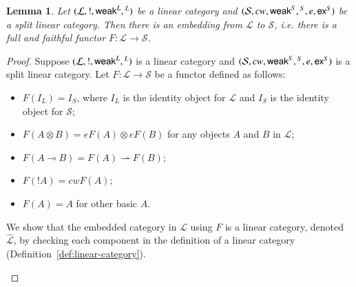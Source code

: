 \documentclass{article}
\newtheorem{lemma}[theorem]{Lemma}
\let\mto\to
\let\to\relax
\newcommand{\to}{\rightarrow}
\let\c\relax
\newcommand{\cat}[1]{\mathcal{#1}}
\newcommand{\limp}[0]{\multimap}
\newcommand{\w}[1]{\mathsf{weak}_{#1}}
\newcommand{\c}[1]{\mathsf{contra}_{#1}}
\newcommand{\e}[1]{\mathsf{ex}_{#1}}
\begin{document}
\begin{lemma}
  \label{lem:embedding}
  Let $(\cat{L},!,\w{}^L,\c{}^L)$ be a linear category and
  $(\cat{S},cw,\w{}^S,\c{}^S,e,\e{}^S)$ be a split linear category. Then
  there is an embedding from $\cat{L}$ to $\cat{S}$, i.e. there is a full
  and faithful functor $F:\cat{L}\mto\cat{S}$.
\end{lemma}
\begin{proof}
  Suppose $(\cat{L},!,\w{}^L,\c{}^L)$ is a linear category and
  $(\cat{S},cw,\w{}^S,\c{}^S,e,\e{}^S)$ is a split linear category.
  Let $F:\cat{L}\mto\cat{S}$ be a functor defined as follows:
  \begin{itemize}
  \item $F(I_L)=I_S$, where $I_L$ is the identity object for $\cat{L}$ and
    $I_S$ is the identity object for $\cat{S}$;
  \item $F(A\otimes B) = eF(A)\otimes eF(B)$ for any objects $A$ and $B$ in
    $\cat{L}$;
  \item $F(A\limp B) = F(A)\rightharpoonup F(B)$;
  \item $F(!A) = cwF(A)$;
  \item $F(A)=A$ for other basic $A$.
  \end{itemize}

  We show that the embedded category in $\cat{L}$ using $F$ is a linear
  category, denoted $\hat{\cat{L}}$, by checking each component in the
  definition of a linear category (Definition~\ref{def:linear-category}).

  \begin{enumerate}[label=\textbf{\emph{\alph*}})]


\end{enumerate}
\end{proof}
\end{document}
